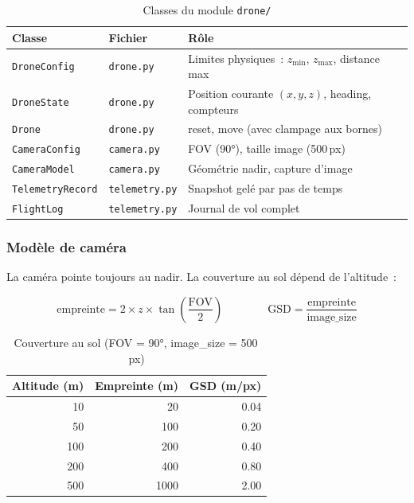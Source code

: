 \documentclass[a4paper, 11pt, french]{article}
\newcommand{\code}[1]{\texttt{#1}}
\begin{document}
\begin{table}[H]
\centering\small
\begin{tabular}{llp{7.5cm}}
\toprule
\textbf{Classe} & \textbf{Fichier} & \textbf{Rôle} \\
\midrule
\code{DroneConfig}     & \code{drone.py}     & Limites physiques~: $z_{\min}$, $z_{\max}$,
                                                 distance max \\
\code{DroneState}      & \code{drone.py}     & Position courante $(x,y,z)$, heading,
                                                 compteurs \\
\code{Drone}           & \code{drone.py}     & reset, move (avec clampage aux bornes) \\
\code{CameraConfig}    & \code{camera.py}    & FOV (90°), taille image (500\,px) \\
\code{CameraModel}     & \code{camera.py}    & Géométrie nadir, capture d'image \\
\code{TelemetryRecord} & \code{telemetry.py} & Snapshot gelé par pas de temps \\
\code{FlightLog}       & \code{telemetry.py} & Journal de vol complet \\
\bottomrule
\end{tabular}
\caption{Classes du module \code{drone/}}
\end{table}

\subsubsection{Modèle de caméra}

La caméra pointe toujours au nadir.  La couverture au sol dépend de
l'altitude~:

\begin{equation}
  \text{empreinte} = 2 \times z \times \tan\!\left(\frac{\text{FOV}}{2}\right)
  \qquad\qquad
  \text{GSD} = \frac{\text{empreinte}}{\text{image\_size}}
\end{equation}

\begin{table}[H]
\centering\small
\begin{tabular}{rrr}
\toprule
\textbf{Altitude (m)} & \textbf{Empreinte (m)} & \textbf{GSD (m/px)} \\
\midrule
10  & 20   & 0.04 \\
50  & 100  & 0.20 \\
100 & 200  & 0.40 \\
200 & 400  & 0.80 \\
500 & 1000 & 2.00 \\
\bottomrule
\end{tabular}
\caption{Couverture au sol (FOV = 90°, image\_size = 500\,px)}
\end{table}
\end{document}
